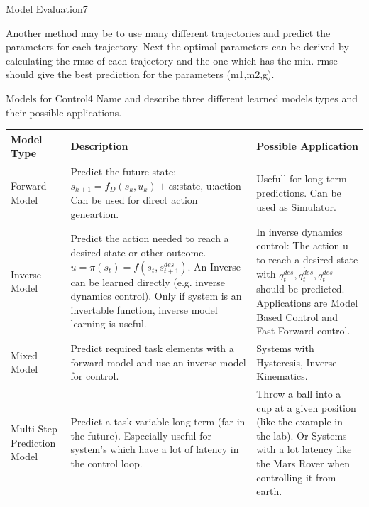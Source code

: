 \begin{questions}
\begin{question}{Model Evaluation}{7}
\begin{answer}
	Another method may be to use many different trajectories and predict the parameters for each trajectory. Next the optimal parameters can be derived by calculating the rmse of each trajectory and the one which has the min. rmse should give the best prediction for the parameters (m1,m2,g).
	
\end{answer}

\end{question}



\begin{question}[bonus]{Models for Control}{4}
Name and describe three different learned models types and their possible applications.
\end{question}
\begin{answer}

\begin{tabular}{|p{4cm}|p{7cm}|p{5cm}|}
		\hline
		Model Type&Description  &Possible Application \\
		\hline
				Forward Model &Predict the future state: $s_{k+1}=f_D(s_k,u_k)+\epsilon$s:state, u:action Can be used for direct action geneartion.  &Usefull for long-term predictions. Can be used as Simulator.
			\\	\hline
			Inverse Model &Predict the action needed to reach a desired state or other outcome. $u=\pi(s_t)=f(s_t,s_{t+1}^{des})$. An Inverse can be learned directly (e.g. inverse dynamics control). Only if system is an invertable function, inverse model learning is useful.&In inverse dynamics control: The action u to reach a desired state with $q_t^{des}, \dot{q_t^{des}},\ddot{q_t^{des}}$ should be predicted. Applications are Model Based Control and Fast Forward control. 	 \\	 \hline 

		Mixed Model&Predict required task elements with a forward model and use an inverse model for control.&Systems with Hysteresis, Inverse Kinematics. \\  \hline
		
		Multi-Step Prediction Model&Predict a task variable long term (far in the future). Especially useful for system's which have a lot of latency in the control loop.                                      &Throw a ball into a cup at a given position (like the example in the lab). Or Systems with a lot latency like the Mars Rover when controlling it from earth.  \\ \hline
\end{tabular}
	
	\end{answer}




\end{questions}
